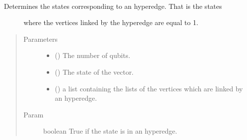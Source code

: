 \documentclass[letterpaper,10pt,english]{sphinxmanual}
\begin{document}

\begin{fulllineitems}
\label{\detokenize{hypergraphstates-opti:mermin_on_qiskit.hypergraphstates_optimization.hypergraphstates.corresponding_state_determination}}~\begin{description}
\item[{Determines the states corresponding to an hyperedge. That is the states }] \leavevmode
where the vertices linked by the hyperedge are equal to 1.

\end{description}
\begin{quote}\begin{description}
\item[{Parameters}] \leavevmode\begin{itemize}
\item {} 
 () \textendash{} The number of qubits.

\item {} 
 (\sphinxstyleliteralemphasis{\sphinxupquote{(}}\sphinxstyleliteralemphasis{\sphinxupquote{)}}) \textendash{} The state of the vector.

\item {} 
 (\sphinxstyleliteralemphasis{\sphinxupquote{(}}\sphinxstyleliteralemphasis{\sphinxupquote{(}}\sphinxstyleliteralemphasis{\sphinxupquote{)}}\sphinxstyleliteralemphasis{\sphinxupquote{)}}) \textendash{} a list containing the lists of the 
vertices which are linked by an hyperedge.

\end{itemize}

\item[{Param}] \leavevmode
boolean \textendash{} True if the state is in an hyperedge.

\end{description}\end{quote}

\end{fulllineitems}
\end{document}
